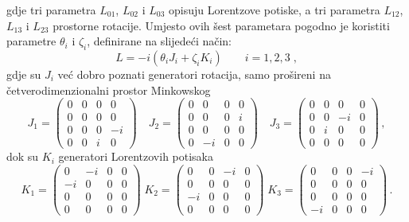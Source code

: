 gdje tri parametra $L_{01}$, $L_{02}$ i $L_{03}$ opisuju Lorentzove
potiske, a tri parametra $L_{12}$, $L_{13}$ i $L_{23}$ prostorne rotacije.
Umjesto ovih šest parametara pogodno je koristiti parametre
$\theta_i$ i $\zeta_i$,  definirane na slijedeći način:
\begin{equation}
 L = -i (\theta_i J_i + \zeta_i K_i)  \qquad i=1,2,3  \;,
\label{eq:LJK}
\end{equation}
gdje su $J_i$ već dobro poznati generatori rotacija, samo prošireni
na četverodimenzionalni prostor Minkowskog
\begin{equation}
 J_1 =
\begin{pmatrix}
0 & 0 & 0 & 0 \\
0 & 0 & 0 & 0 \\
0 & 0 & 0 & -i \\
0 & 0 & i & 0
\end{pmatrix} \quad
 J_2 =
\begin{pmatrix}
0 & 0 & 0 & 0 \\
0 & 0 & 0 & i \\
0 & 0 & 0 & 0 \\
0 & -i & 0 & 0
\end{pmatrix} \quad
J_3 =
\begin{pmatrix}
0 & 0 & 0 & 0 \\
0 & 0 & -i & 0 \\
0 & i & 0 & 0 \\
0 & 0 & 0 & 0
\label{eq:defJi}
\end{pmatrix} \,,
\end{equation}
dok su $K_i$ generatori Lorentzovih potisaka
\begin{equation}
K_1 =
\begin{pmatrix}
0 & -i & 0 & 0 \\
-i & 0 & 0 & 0 \\
0 & 0 & 0 & 0 \\
0 & 0 & 0 & 0
\end{pmatrix} \;
K_2=
\begin{pmatrix}
0 & 0 & -i & 0 \\
0 & 0 & 0 & 0 \\
-i & 0 & 0 & 0 \\
0 & 0 & 0 & 0
\end{pmatrix} \;
K_3 =
\begin{pmatrix}
0 & 0 & 0 & -i \\
0 & 0 & 0 & 0 \\
0 & 0 & 0 & 0 \\
-i & 0 & 0 & 0
\end{pmatrix} \,.
\label{eq:defKi}
\end{equation}


